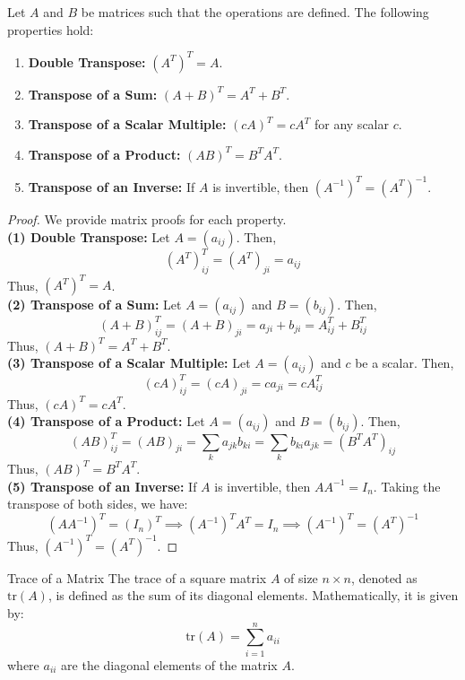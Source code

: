 \documentclass[openany]{book}
\begin{document}
\begin{mytheorem}
Let $A$ and $B$ be matrices such that the operations are defined. The following properties hold:
\begin{enumerate}
    \item \textbf{Double Transpose:} $(A^T)^T = A$.
    \item \textbf{Transpose of a Sum:} $(A + B)^T = A^T + B^T$.
    \item \textbf{Transpose of a Scalar Multiple:} $(cA)^T = cA^T$ for any scalar $c$.
    \item \textbf{Transpose of a Product:} $(AB)^T = B^T A^T$.
    \item \textbf{Transpose of an Inverse:} If $A$ is invertible, then $(A^{-1})^T = (A^T)^{-1}$.
\end{enumerate}
\end{mytheorem}
\begin{proof}
    We provide matrix proofs for each property. \\
    \textbf{(1) Double Transpose:} Let $A = (a_{ij})$. Then,
    \[(A^T)^T_{ij} = (A^T)_{ji} = a_{ij}\]
    Thus, $(A^T)^T = A$. \\
    \textbf{(2) Transpose of a Sum:} Let $A = (a_{ij})$ and $B = (b_{ij})$. Then,
    \[(A + B)^T_{ij} = (A + B)_{ji} = a_{ji} + b_{ji} = A^T_{ij} + B^T_{ij}\]
    Thus, $(A + B)^T = A^T + B^T$. \\
    \textbf{(3) Transpose of a Scalar Multiple:} Let $A = (a_{ij})$ and $c$ be a scalar. Then,
    \[(cA)^T_{ij} = (cA)_{ji} = c a_{ji} = c A^T_{ij}\]
    Thus, $(cA)^T = cA^T$. \\
    \textbf{(4) Transpose of a Product:} Let $A = (a_{ij})$ and $B = (b_{ij})$. Then,
    \[(AB)^T_{ij} = (AB)_{ji} = \sum_{k} a_{jk} b_{ki} = \sum_{k} b_{ki} a_{jk} = (B^T A^T)_{ij}\]
    Thus, $(AB)^T = B^T A^T$. \\
    \textbf{(5) Transpose of an Inverse:} If $A$ is invertible, then $AA^{-1} = I_n$. Taking the transpose of both sides, we have:
    \[(AA^{-1})^T = (I_n)^T \implies (A^{-1})^T A^T = I_n \implies (A^{-1})^T = (A^T)^{-1}\]
    Thus, $(A^{-1})^T = (A^T)^{-1}$.
\end{proof}
\begin{mydefinition}{Trace of a Matrix}
The trace of a square matrix $A$ of size $n \times n$, denoted as $\text{tr}(A)$, is defined as the sum of its diagonal elements. Mathematically, it is given by:
\[\text{tr}(A) = \sum_{i=1}^{n} a_{ii}\]
where $a_{ii}$ are the diagonal elements of the matrix $A$.
\end{mydefinition}
\end{document}
